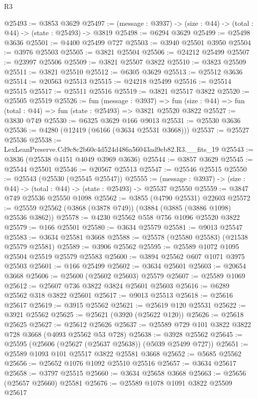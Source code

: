 \begin{lexlean}{R3}
\begin{coremodule}
@25493 := @3853 @3629
@25497 := (message : @3937) -> (size : @44) -> (total : @44) -> (state : @25493) -> @3819
@25498 := @6294 @3629
@25499 := @25498 @3636
@25501 := @4400 @25499 @727
@25503 := @3940 @25501 @3950
@25504 := @3976 @25503
@25505 := @3821 @25504
@25506 := @24212 @25499
@25507 := @23997 @25506
@25509 := @3821 @25507 @3822
@25510 := @3823 @25509
@25511 := @3821 @25510
@25512 := @6305 @3629
@25513 := @25512 @3636
@25514 := @20563 @25513
@25515 := @24218 @25499
@25516 := @25514 @25515
@25517 := @25511 @25516
@25519 := @3821 @25517 @3822
@25520 := @25505 @25519
@25526 := fun (message : @3937) =>
  fun (size : @44) => fun (total : @44) => fun (state : @25493) => @3821 @25520 @3822
@25527 := @3830 @749
@25530 := @6325 @3629 @166 @9013
@25531 := @25530 @3636
@25536 := @4280 (@12419 (@6166 (@3634 @25531 @3668)))
@25537 := @25527 @25536
@25538 := LexLeanPreserve.Cd9c8c2b60c4d524d486a56043ad9eb82.R3.__fits_19
@25543 := @3836 (@25538 @4151 @4049 @3969 @3636)
@25544 := @3857 @3629
@25545 := @25544 @25501
@25546 := @20567 @25513
@25547 := @25546 @25515
@25550 := @25543 (@25530 (@25545 @25547))
@25555 := (message : @3937) -> (size : @44) -> (total : @44) -> (state : @25493) -> @25537 @25550
@25559 := @3847 @749 @25536 @25550 @1098
@25562 := @3855 (@4790 @25531) @22603
@25572 := @25559 @25562 (@3868 (@3878 @749)) (@3884 (@3885 (@3886 @1098) @25536 @3862))
@25578 := @4230 @25562 @558 @756 @1096 @25520 @3822
@25579 := @166 @25501
@25580 := @3634 @25579
@25581 := @9013 @25547
@25583 := @3634 @25581 @3668
@25588 := @25578 (@25580 @25583) (@21538 @25579 @25581)
@25589 := @3906 @25562
@25595 := @25589 @1072 @1095 @25504 @25519 @25579 @25583
@25600 := @3894 @25562 @607 @1071 @3975 @25503
@25601 := @166 @25499
@25602 := @3634 @25601
@25603 := @20654 @3668
@25606 := @25600 (@25602 @25603) @25579
@25607 := @25589 @1069
@25612 := @25607 @736 @3822 @3824 @25601 @25603
@25616 := @6289 @25562 @318 @3822 @25601
@25617 := @9013 @25513
@25618 := @25616 @25617
@25619 := @3915 @25562
@25621 := @25619 @120 @25531
@25622 := @3921 @25562
@25625 := @25621 (@3920 (@25622 @120))
@25626 := @25618 @25625
@25627 := @25612 @25626
@25637 := @25589 @729 @101 @3822 @3822 @728 @3668 (@4093 @25562 @53 @728)
@25638 := @3928 @25562
@25645 := @25595 (@25606 (@25627 (@25637 @25638)) (@5039 @25499 @727))
@25651 := @25589 @1093 @101 @25517 @3822 @25581 @3668
@25652 := @5685 @25562
@25656 := @25652 @1076 @1092 @25510 @25516
@25657 := @3634 @25617
@25658 := @3797 @25515
@25660 := @3634 @25658 @3668
@25663 := @25656 (@25657 @25660) @25581
@25676 := @25589
    @1078
    @1091
    @3822
    @25509
    @25617

\end{coremodule}
\end{lexlean}
